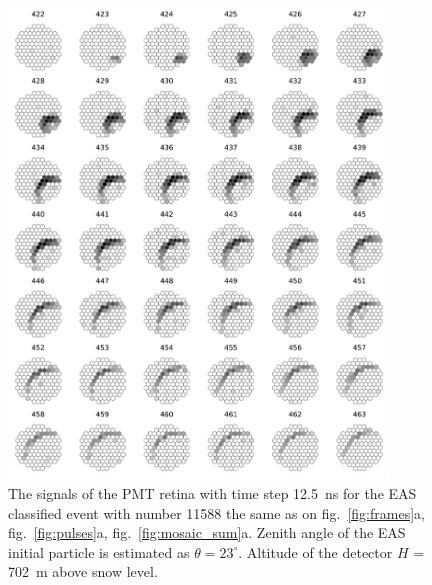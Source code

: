 \documentclass[final,5p,times,twocolumn]{elsarticle}
\begin{document}
\begin{figure}[pt]
    \centering
    \includegraphics[width=0.9\textwidth]{figs/retina_11588_log1.pdf}%
    \caption{The signals of the PMT retina with time step 12.5~ns for the EAS classified event with number 11588 the same as on fig.~\ref{fig:frames}a, fig.~\ref{fig:pulses}a, fig.~\ref{fig:mosaic_sum}a. Zenith angle of the EAS initial particle is estimated as $\theta = 23^{\circ}$. Altitude of the detector $H$ = 702~m above snow level.
    }
    \label{fig:retina_eas2}
\end{figure}
\end{document}
